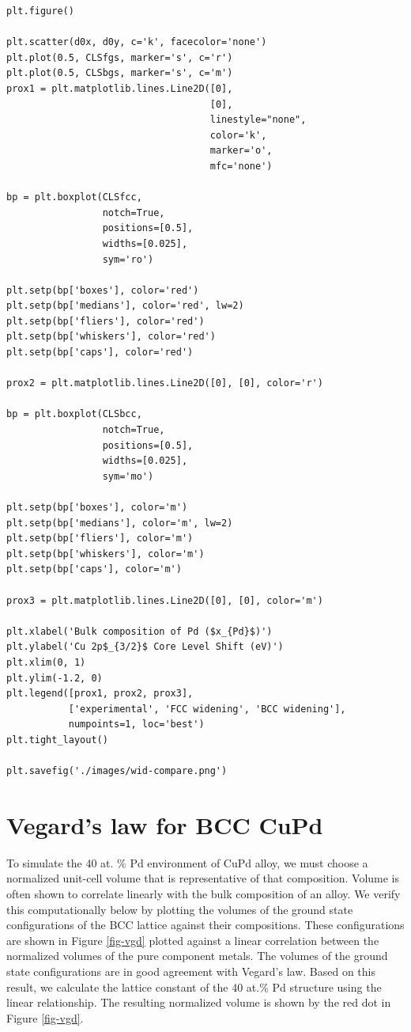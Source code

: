 \documentclass[number, sort&compress, review, 12pt]{elsarticle}
\begin{document}
\begin{verbatim}
plt.figure()

plt.scatter(d0x, d0y, c='k', facecolor='none')
plt.plot(0.5, CLSfgs, marker='s', c='r')
plt.plot(0.5, CLSbgs, marker='s', c='m')
prox1 = plt.matplotlib.lines.Line2D([0],
                                    [0],
                                    linestyle="none",
                                    color='k',
                                    marker='o',
                                    mfc='none')

bp = plt.boxplot(CLSfcc,
                 notch=True,
                 positions=[0.5],
                 widths=[0.025],
                 sym='ro')

plt.setp(bp['boxes'], color='red')
plt.setp(bp['medians'], color='red', lw=2)
plt.setp(bp['fliers'], color='red')
plt.setp(bp['whiskers'], color='red')
plt.setp(bp['caps'], color='red')

prox2 = plt.matplotlib.lines.Line2D([0], [0], color='r')

bp = plt.boxplot(CLSbcc,
                 notch=True,
                 positions=[0.5],
                 widths=[0.025],
                 sym='mo')

plt.setp(bp['boxes'], color='m')
plt.setp(bp['medians'], color='m', lw=2)
plt.setp(bp['fliers'], color='m')
plt.setp(bp['whiskers'], color='m')
plt.setp(bp['caps'], color='m')

prox3 = plt.matplotlib.lines.Line2D([0], [0], color='m')

plt.xlabel('Bulk composition of Pd ($x_{Pd}$)')
plt.ylabel('Cu 2p$_{3/2}$ Core Level Shift (eV)')
plt.xlim(0, 1)
plt.ylim(-1.2, 0)
plt.legend([prox1, prox2, prox3],
           ['experimental', 'FCC widening', 'BCC widening'],
           numpoints=1, loc='best')
plt.tight_layout()

plt.savefig('./images/wid-compare.png')
\end{verbatim}

\section{Vegard's law for BCC CuPd}
\label{sec-8}
To simulate the 40 at. \% Pd environment of CuPd alloy, we must choose a normalized unit-cell volume that is representative of that composition. Volume is often shown to correlate linearly with the bulk composition of an alloy. We verify this computationally below by plotting the volumes of the ground state configurations of the BCC lattice against their compositions. These configurations are shown in Figure \ref{fig-vgd} plotted against a linear correlation between the normalized volumes of the pure component metals. The volumes of the ground state configurations are in good agreement with Vegard's law. Based on this result, we calculate the lattice constant of the 40 at.\% Pd structure using the linear relationship. The resulting normalized volume is shown by the red dot in Figure \ref{fig-vgd}.
\end{document}
